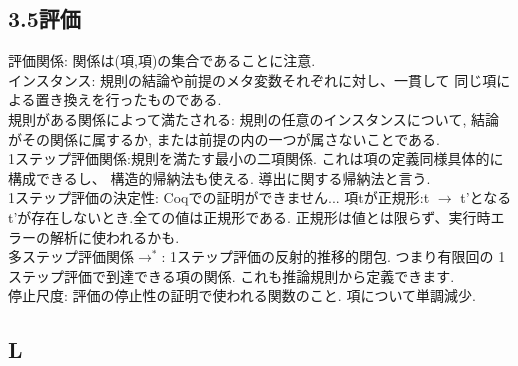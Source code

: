 \documentclass[a4paper,10pt]{article}
\begin{document}
\subsection*{3.5評価}
評価関係: 関係は(項,項)の集合であることに注意.\\
インスタンス: 規則の結論や前提のメタ変数それぞれに対し、一貫して
同じ項による置き換えを行ったものである.\\
規則がある関係によって満たされる: 規則の任意のインスタンスについて,
結論がその関係に属するか, または前提の内の一つが属さないことである.\\
1ステップ評価関係:規則を満たす最小の二項関係. これは項の定義同様具体的に構成できるし、
構造的帰納法も使える. 導出に関する帰納法と言う. \\
1ステップ評価の決定性: Coqでの証明ができません...
項tが正規形:t $\rightarrow$ t'となるt'が存在しないとき.全ての値は正規形である. 正規形は値とは限らず、実行時エラーの解析に使われるかも. \\
多ステップ評価関係$\rightarrow^*$: 1ステップ評価の反射的推移的閉包. つまり有限回の
1ステップ評価で到達できる項の関係. これも推論規則から定義できます. \\
停止尺度: 評価の停止性の証明で使われる関数のこと. 項について単調減少.
\subsection*{L}
\end{document}
